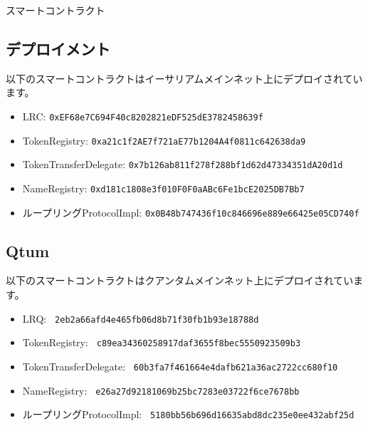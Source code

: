 \documentclass{article}
\makeatletter
\newenvironment{figurehere}
 {\def\@captype{figure}}
 {}
\makeatother
\begin{document}
\begin{appendices}
\begin{center}
\begin{figurehere}
\caption{スマートコントラクト}
\label{fig:smartcontracts}
\end{figurehere}
\end{center}

\subsection{デプロイメント}

以下のスマートコントラクトはイーサリアムメインネット上にデプロイされています。

\begin{itemize}
\item LRC: \verb|0xEF68e7C694F40c8202821eDF525dE3782458639f|
\item TokenRegistry: \verb|0xa21c1f2AE7f721aE77b1204A4f0811c642638da9|
\item TokenTransferDelegate: \verb|0x7b126ab811f278f288bf1d62d47334351dA20d1d|
\item NameRegistry: \verb|0xd181c1808e3f010F0F0aABc6Fe1bcE2025DB7Bb7|
\item ループリングProtocolImpl: \verb|0x0B48b747436f10c846696e889e66425e05CD740f|
\end{itemize}

\subsection{Qtum}
以下のスマートコントラクトはクアンタムメインネット上にデプロイされています。
\begin{itemize}
\item LRQ: \verb| 2eb2a66afd4e465fb06d8b71f30fb1b93e18788d |
\item TokenRegistry: \verb| c89ea34360258917daf3655f8bec5550923509b3 |
\item TokenTransferDelegate: \verb| 60b3fa7f461664e4dafb621a36ac2722cc680f10 |
\item NameRegistry: \verb| e26a27d92181069b25bc7283e03722f6ce7678bb |
\item ループリングProtocolImpl: \verb| 5180bb56b696d16635abd8dc235e0ee432abf25d |
\end{itemize}


\end{appendices}
\end{document}
